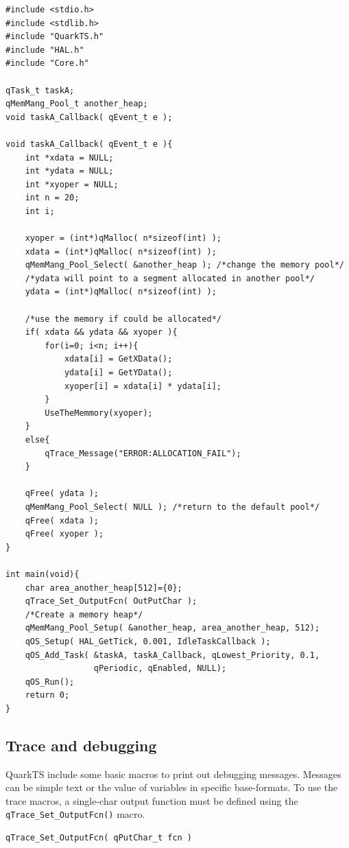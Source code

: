 \documentclass{article}
\begin{document}
\begin{lstlisting}[style=CStyle]
#include <stdio.h>
#include <stdlib.h>
#include "QuarkTS.h"
#include "HAL.h"
#include "Core.h"

qTask_t taskA;
qMemMang_Pool_t another_heap;
void taskA_Callback( qEvent_t e );

void taskA_Callback( qEvent_t e ){
    int *xdata = NULL;
    int *ydata = NULL;
    int *xyoper = NULL;
    int n = 20;
    int i;
    
    xyoper = (int*)qMalloc( n*sizeof(int) );
    xdata = (int*)qMalloc( n*sizeof(int) );
    qMemMang_Pool_Select( &another_heap ); /*change the memory pool*/
    /*ydata will point to a segment allocated in another pool*/
    ydata = (int*)qMalloc( n*sizeof(int) ); 
    
    /*use the memory if could be allocated*/
    if( xdata && ydata && xyoper ){ 
        for(i=0; i<n; i++){
            xdata[i] = GetXData();
            ydata[i] = GetYData();
            xyoper[i] = xdata[i] * ydata[i];
        }
        UseTheMemmory(xyoper);
    }
    else{
        qTrace_Message("ERROR:ALLOCATION_FAIL");
    }

    qFree( ydata );
    qMemMang_Pool_Select( NULL ); /*return to the default pool*/
    qFree( xdata );
    qFree( xyoper );
}

int main(void){
    char area_another_heap[512]={0};
    qTrace_Set_OutputFcn( OutPutChar );
    /*Create a memory heap*/
    qMemMang_Pool_Setup( &another_heap, area_another_heap, 512); 
    qOS_Setup( HAL_GetTick, 0.001, IdleTaskCallback );
    qOS_Add_Task( &taskA, taskA_Callback, qLowest_Priority, 0.1, 
                  qPeriodic, qEnabled, NULL);
    qOS_Run();
    return 0;
}

\end{lstlisting}  

\subsection{Trace and debugging}
QuarkTS include some basic macros to print out debugging messages. Messages can be simple text or the value of variables in specific base-formats. 
To use the trace macros, a single-char output function must be defined using the \lstinline{qTrace_Set_OutputFcn()} macro. \\

\begin{lstlisting}[style=CStyle]
qTrace_Set_OutputFcn( qPutChar_t fcn )
\end{lstlisting}
\end{document}
